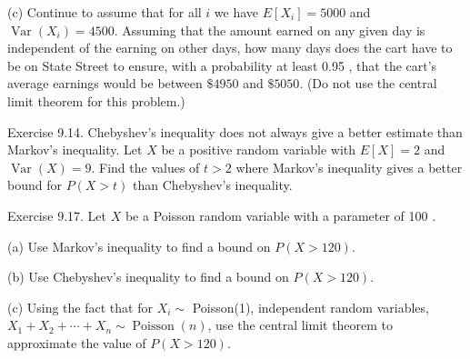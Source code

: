 \documentclass[10pt]{article}
\begin{document}
(c) Continue to assume that for all $i$ we have $E\left[X_{i}\right]=5000$ and $\operatorname{Var}\left(X_{i}\right)=4500$. Assuming that the amount earned on any given day is independent of the earning on other days, how many days does the cart have to be on State Street to ensure, with a probability at least 0.95 , that the cart's average earnings would be between $\$ 4950$ and $\$ 5050$. (Do not use the central limit theorem for this problem.)

\hfill \break
Exercise 9.14. Chebyshev's inequality does not always give a better estimate than Markov's inequality. Let $X$ be a positive random variable with $E[X]=2$ and $\operatorname{Var}(X)=9$. Find the values of $t>2$ where Markov's inequality gives a better bound for $P(X>t)$ than Chebyshev's inequality.

\hfill \break
Exercise 9.17. Let $X$ be a Poisson random variable with a parameter of 100 .

(a) Use Markov's inequality to find a bound on $P(X>120)$.

(b) Use Chebyshev's inequality to find a bound on $P(X>120)$.

(c) Using the fact that for $X_{i} \sim$ Poisson(1), independent random variables, $X_{1}+X_{2}+\cdots+X_{n} \sim \operatorname{Poisson}(n)$, use the central limit theorem to approximate the value of $P(X>120)$.
\end{document}
